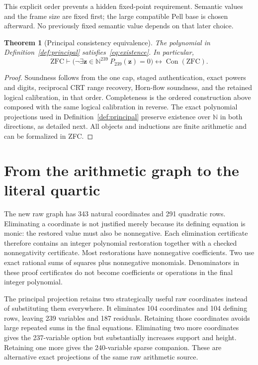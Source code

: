 \documentclass[11pt]{article}
\newtheorem{theorem}{Theorem}[section]
\theoremstyle{definition}\newtheorem{definition}[theorem]{Definition}
\theoremstyle{remark}\newtheorem{remark}[theorem]{Remark}
\newcommand{\N}{\mathbb N}\newcommand{\Z}{\mathbb Z}\newcommand{\Q}{\mathbb Q}
\newcommand{\Con}{\operatorname{Con}}\newcommand{\Refut}{\operatorname{Refut}}
\begin{document}
This explicit order prevents a hidden fixed-point requirement. Semantic values and the frame size are fixed first; the large compatible Pell base is chosen afterward. No previously fixed semantic value depends on that later choice.

\begin{theorem}[Principal consistency equivalence]\label{thm:main}
The polynomial in Definition~\ref{def:principal} satisfies~\eqref{eq:existence}. In particular,
\[
 \mathrm{ZFC}\vdash
 \bigl(\neg\exists\mathbf z\in\N^{239}\ P_{239}(\mathbf z)=0\bigr)
 \longleftrightarrow\Con(\mathrm{ZFC}).
\]
\end{theorem}
\begin{proof}
Soundness follows from the one cap, staged authentication, exact powers and digits, reciprocal CRT range recovery, Horn-flow soundness, and the retained logical calibration, in that order. Completeness is the ordered construction above composed with the same logical calibration in reverse. The exact polynomial projections used in Definition~\ref{def:principal} preserve existence over $\N$ in both directions, as detailed next. All objects and inductions are finite arithmetic and can be formalized in ZFC.
\end{proof}

\section{From the arithmetic graph to the literal quartic}

The new raw graph has 343 natural coordinates and 291 quadratic rows. Eliminating a coordinate is not justified merely because its defining equation is monic: the restored value must also be nonnegative. Each elimination certificate therefore contains an integer polynomial restoration together with a checked nonnegativity certificate. Most restorations have nonnegative coefficients. Two use exact rational sums of squares plus nonnegative monomials. Denominators in these proof certificates do not become coefficients or operations in the final integer polynomial.

The principal projection retains two strategically useful raw coordinates instead of substituting them everywhere. It eliminates 104 coordinates and 104 defining rows, leaving 239 variables and 187 residuals. Retaining those coordinates avoids large repeated sums in the final equations. Eliminating two more coordinates gives the 237-variable option but substantially increases support and height. Retaining one more gives the 240-variable sparse companion. These are alternative exact projections of the same raw arithmetic source.
\end{document}
